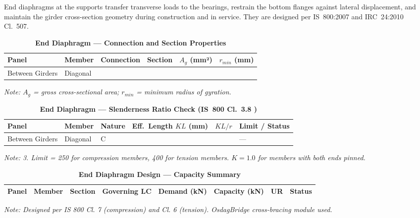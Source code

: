 \documentclass{article}
\begin{document}
End diaphragms at the supports transfer transverse loads to the bearings, restrain the bottom flanges against lateral displacement, and maintain the girder cross-section geometry during construction and in service. They are designed per IS~800:2007 and IRC~24:2010 Cl.~507.

\vspace{1em}

\vspace{0.4em}
\noindent
\setlength{\tabcolsep}{4pt}
\setlength{\LTleft}{0pt}
\setlength{\LTright}{\fill}

\begin{longtable}{|C{2.0cm}|L{2.0cm}|L{2.2cm}|C{2.5cm}|C{2.0cm}|C{2.0cm}|}
\caption{\textbf{End Diaphragm --- Connection and Section Properties}}
\hline
\textbf{Panel} & \textbf{Member} & \textbf{Connection} & \textbf{Section} & \textbf{$A_g$ (mm²)} & \textbf{$r_{min}$ (mm)} \\[6pt]
\hline
Between Girders & Diagonal &  &  &  &  \\[6pt]
\hline
\end{longtable}
\noindent\textit{Note: $A_g$ = gross cross-sectional area; $r_{min}$ = minimum radius of gyration.}

\vspace{1em}
\begin{longtable}{|C{2.2cm}|L{2.2cm}|L{2.5cm}|C{2.5cm}|C{2.5cm}|>{\centering\arraybackslash}p{3.6cm}|}
\caption{\textbf{End Diaphragm --- Slenderness Ratio Check (IS~800 Cl.~3.8 )}}
\hline
\textbf{Panel} & \textbf{Member} & \textbf{Nature} & \textbf{Eff.\ Length $KL$ (mm)} & \textbf{$KL/r$} & \textbf{Limit / Status} \\[6pt]
\hline
Between Girders & Diagonal & C &  &  &  ---  \\[6pt]
\hline
\end{longtable}
\noindent\textit{Note:  3. Limit = 250 for compression members, 400 for tension members. $K = 1.0$ for members with both ends pinned.}

\vspace{1em}

\begin{longtable}{|C{2.0cm}|L{1.8cm}|C{2.2cm}|C{3.0cm}|C{1.8cm}|C{1.8cm}|C{1.2cm}|C{1.8cm}|}
\caption{\textbf{End Diaphragm Design --- Capacity Summary}}
\hline
\textbf{Panel} & \textbf{Member} & \textbf{Section} & \textbf{Governing LC} & \textbf{Demand (kN)} & \textbf{Capacity (kN)} & \textbf{UR} & \textbf{Status} \\[6pt]
\hline

\end{longtable}
\noindent\textit{Note: Designed per IS 800 Cl. 7 (compression) and Cl. 6 (tension). OsdagBridge cross-bracing module used.}
\end{document}
